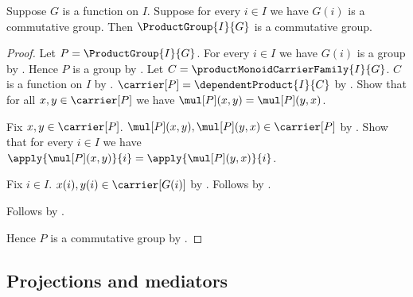 \begin{proposition}\label{product_group_is_commutative}
    Suppose $G$ is a function on $I$.
    Suppose for every $i\in I$ we have $G(i)$ is a commutative group.
    Then $\ProductGroup{I}{G}$ is a commutative group.
\end{proposition}
\begin{proof}
    Let $P=\ProductGroup{I}{G}$.
    For every $i\in I$ we have $G(i)$ is a group by
        .
    Hence $P$ is a group by .
    Let $C=\productMonoidCarrierFamily{I}{G}$.
    $C$ is a function on $I$ by
        .
    $\carrier[P]=\dependentProduct{I}{C}$ by
        .
    Show that for all $x,y\in\carrier[P]$ we have
        $\mul[P](x,y)=\mul[P](y,x)$.
    \begin{subproof}
        Fix $x,y\in\carrier[P]$.
        $\mul[P](x,y),\mul[P](y,x)\in\carrier[P]$ by
            .
        Show that for every $i\in I$ we have
            $\apply{\mul[P](x,y)}{i}=\apply{\mul[P](y,x)}{i}$.
        \begin{subproof}
            Fix $i\in I$.
            $x(i),y(i)\in\carrier[G(i)]$ by
                .
            Follows by
                .
        \end{subproof}
        Follows by .
    \end{subproof}
    Hence $P$ is a commutative group by
        .
\end{proof}

\subsection{Projections and mediators}

